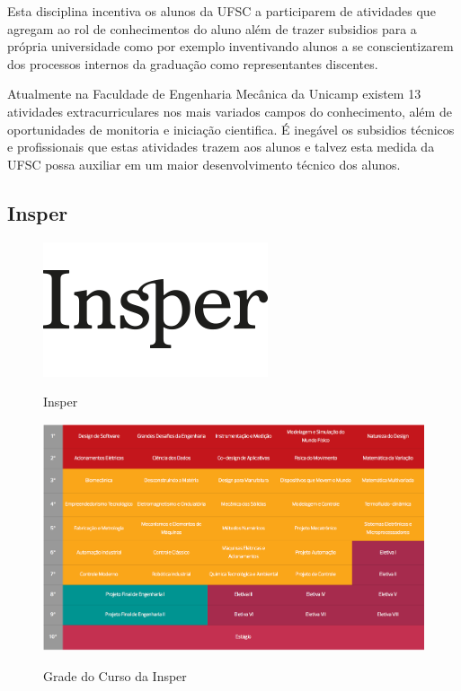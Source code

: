 \documentclass[12pt]{article} %
\begin{document}
Esta disciplina incentiva os alunos da UFSC a participarem de atividades que agregam ao rol de conhecimentos do aluno além de trazer subsidios para a própria universidade como por exemplo inventivando alunos a se conscientizarem dos processos internos da graduação como representantes discentes.

Atualmente na Faculdade de Engenharia Mecânica da Unicamp existem 13 atividades extracurriculares nos mais variados campos do conhecimento, além de oportunidades de monitoria e iniciação cientifica. É inegável os subsidios técnicos e profissionais que estas atividades trazem aos alunos e talvez esta medida da UFSC possa auxiliar em um maior desenvolvimento técnico dos alunos.


\subsection{Insper}


\begin{figure}[H]
\centering
\includegraphics[scale=0.3]{pictures/insperLogo.png}\\
\caption{Insper}
\end{figure}

\begin{figure}[H]
\centering
\includegraphics[scale=0.25]{pictures/gradeInsper.png}\\
\caption{Grade do Curso da Insper}
\end{figure}
\end{document}
